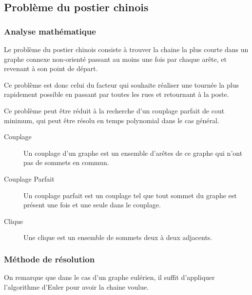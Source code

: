 \subsection{Problème du postier chinois}
  \subsubsection{Analyse mathématique}
    Le problème du postier chinois consiste à trouver la chaine la plus courte
    dans un graphe connexe non-orienté passant au moins une fois par chaque
    arête, et revenant à son point de départ.

    Ce problème est donc celui du facteur qui souhaite réaliser une tournée
    la plus rapidement possible en passant par toutes les rues et retournant
    à la poste.

    Ce problème peut être réduit à la recherche d'un couplage parfait de cout
    minimum, qui peut être résolu en temps polynomial dans le cas général.

    \begin{description}
      \item[Couplage] Un couplage d'un graphe est un ensemble d'arêtes de ce
        graphe qui n'ont pas de sommets en commun.
      \item[Couplage Parfait] Un couplage parfait est un couplage tel que tout
        sommet du graphe est présent une fois et une seule dans le couplage.
      \item[Clique] Une clique est un ensemble de sommets deux à deux
        adjacents.
    \end{description}

  \subsubsection{Méthode de résolution}
    On remarque que dans le cas d'un graphe eulérien, il suffit d'appliquer
    l'algorithme d'Euler pour avoir la chaine voulue.

